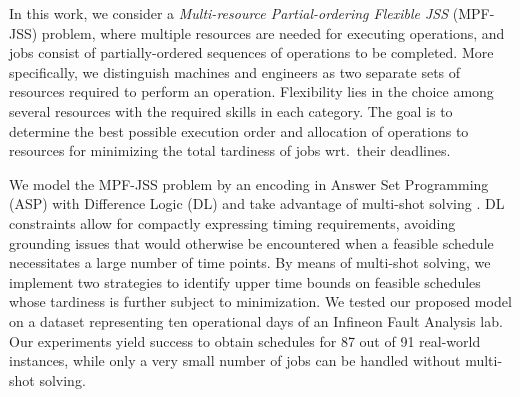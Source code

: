 \documentclass[submission,copyright,creativecommons]{eptcs}
\begin{document}
In this work, we consider a \emph{Multi-resource Partial-ordering Flexible JSS} (MPF-JSS) problem, where multiple resources are needed for executing operations, and jobs consist of partially-ordered sequences of operations to be completed.
More specifically, we distinguish machines and engineers as two separate sets of resources
required to perform an operation.
Flexibility lies in the choice among several resources with the required skills in each category.
The goal is to determine the best possible execution order and allocation of operations to resources %
for minimizing the total tardiness of jobs wrt.\ their deadlines. 

We model the MPF-JSS problem by an encoding in Answer Set Programming (ASP) with Difference Logic (DL) \cite{gebser2016theory} and take advantage of multi-shot solving \cite{gebser2019multi}.
DL constraints allow for compactly expressing timing requirements, avoiding grounding issues that would otherwise be encountered when a feasible schedule necessitates a large number of time points.
By means of multi-shot solving, we implement two strategies to identify upper time bounds on feasible schedules whose tardiness is further subject to minimization.
We tested our proposed model on a dataset representing ten operational days of an Infineon Fault Analysis lab.
Our experiments yield success to obtain schedules for 87 out of 91 real-world instances,
while only a very small number of jobs can be handled without multi-shot solving.
\end{document}
